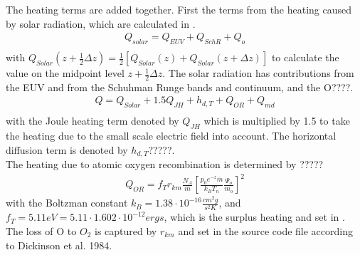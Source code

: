 %
The heating terms are added together. First the terms from the heating caused by
 solar radiation, which are calculated in .
%
\begin{align}
  Q_{solar} = Q_{EUV} + Q_{SchR} + Q_o \\
\end{align}
%
with $Q_{Solar}(z+\frac{1}{2}\Delta z)=
\frac{1}{2}[Q_{Solar}(z)+Q_{Solar}(z+\Delta z)]$ to calculate the
value on the midpoint level $z+\frac{1}{2}\Delta z$. The solar
radiation has contributions from the EUV and from the Schuhman Runge
bands and continuum, and the O????.
%
\begin{align}
  Q = Q_{Solar} + 1.5 Q_{JH} + h_{d,T} + Q_{OR} + Q_{md}\\
\end{align}
%
with the Joule heating term denoted by $Q_{JH}$ which is multiplied
by 1.5 to take the heating due to the small scale electric field
into account. The horizontal diffusion term is denoted by
$h_{d,T}$?????. \\

%
The heating due to atomic oxygen recombination is determined by
?????
%
\begin{align}
  Q_{OR} = f_T r_{km} \frac{N_A}{\overline{m}}\left[
   \frac{p_0 e^{-z}\overline{m}}{k_B T_n} \frac{\Psi_o}{m_o}
   \right]^2
\end{align}
%
with the Boltzman constant $k_B = 1.38 \cdot 10^{-16}\frac{cm^2
g}{s^2 K}$, and $f_T = 5.11 eV = 5.11 \cdot 1.602 \cdot 10^{-12}
ergs$, which is the surplus heating and set in .
The loss of O to $O_2$ is captured by
$r_{km}$ and set in the source code file  according to Dickinson et al. 1984.\\

